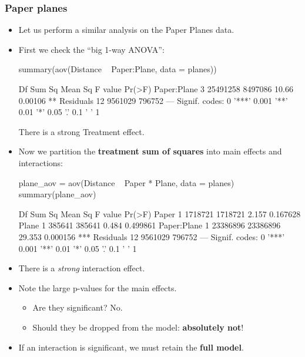 \documentclass[a4paper]{article}\usepackage[]{graphicx}\usepackage[]{xcolor}
\begin{document}
\subsubsection{Paper planes}
\begin{itemize}
	\item Let us perform a similar analysis on the Paper Planes data.
	\item First we check the ``big 1-way ANOVA'':
\begin{Schunk}
\begin{Sinput}
summary(aov(Distance ~ Paper:Plane, data = planes))
\end{Sinput}
\begin{Soutput}
            Df   Sum Sq Mean Sq F value  Pr(>F)   
Paper:Plane  3 25491258 8497086   10.66 0.00106 **
Residuals   12  9561029  796752                   
---
Signif. codes:  0 '***' 0.001 '**' 0.01 '*' 0.05 '.' 0.1 ' ' 1
\end{Soutput}
\end{Schunk}
	There is a strong Treatment effect.
	\item Now we partition the \textbf{treatment sum of squares} into main effects and interactions:
\begin{Schunk}
\begin{Sinput}
plane_aov = aov(Distance ~ Paper * Plane, data = planes)
summary(plane_aov)
\end{Sinput}
\begin{Soutput}
            Df   Sum Sq  Mean Sq F value   Pr(>F)    
Paper        1  1718721  1718721   2.157 0.167628    
Plane        1   385641   385641   0.484 0.499861    
Paper:Plane  1 23386896 23386896  29.353 0.000156 ***
Residuals   12  9561029   796752                     
---
Signif. codes:  0 '***' 0.001 '**' 0.01 '*' 0.05 '.' 0.1 ' ' 1
\end{Soutput}
\end{Schunk}
	\item There is a \textit{strong} interaction effect.
	\item Note the large p-values for the main effects.
	\begin{itemize}
		\item Are they significant? No.
		\item Should they be dropped from the model: \textbf{absolutely not}!
	\end{itemize}
	\item If an interaction is significant, we must retain the \textbf{full model}.
\end{itemize}
\end{document}
